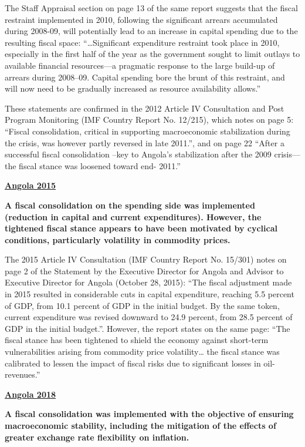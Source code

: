 The Staff Appraisal section on page 13 of the same report suggests that the fiscal restraint implemented in 2010, following the significant arrears accumulated during 2008-09, will potentially lead to an increase in capital spending due to the resulting fiscal space: “…Significant expenditure restraint took place in 2010, especially in the first half of the year as the government sought to limit outlays to available financial resources—a pragmatic response to the large build-up of arrears during 2008–09. Capital spending bore the brunt of this restraint, and will now need to be gradually increased as resource availability allows.”

These statements are confirmed in the 2012 Article IV Consultation and Post Program Monitoring (IMF Country Report No. 12/215), which notes on page 5: “Fiscal consolidation, critical in supporting macroeconomic stabilization during the crisis, was however partly reversed in late 2011.”, and on page 22 “After a successful fiscal consolidation –key to Angola’s stabilization after the 2009 crisis— the fiscal stance was loosened toward end- 2011.”

\textbf{\underline{Angola 2015}}

\textbf{A fiscal consolidation on the spending side was implemented (reduction in capital and current expenditures). However, the tightened fiscal stance appears to have been motivated by cyclical conditions, particularly volatility in commodity prices.}

The 2015 Article IV Consultation (IMF Country Report No. 15/301) notes on page 2 of the Statement by the Executive Director for Angola and Advisor to Executive Director for Angola (October 28, 2015): “The fiscal adjustment made in 2015 resulted in considerable cuts in capital expenditure, reaching 5.5 percent of GDP, from 10.1 percent of GDP in the initial budget. By the same token, current expenditure was revised downward to 24.9 percent, from 28.5 percent of GDP in the initial budget.”. However, the report states on the same page: “The fiscal stance has been tightened to shield the economy against short-term vulnerabilities arising from commodity price volatility… the fiscal stance was calibrated to lessen the impact of fiscal risks due to significant losses in oil-revenues.”

\textbf{\underline{Angola 2018}}

\textbf{A fiscal consolidation was implemented with the objective of ensuring macroeconomic stability, including the mitigation of the effects of greater exchange rate flexibility on inflation.}

